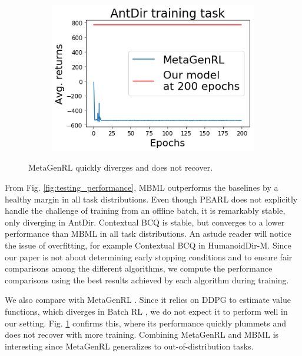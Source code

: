 \begin{figure}
    \vspace{-0.6em}
    \flushright
    \begin{subfigure}{0.259\paperwidth}
        \includegraphics[width=\linewidth]{chapter_2/fig/metagenrl.png}
    \end{subfigure}
    \caption{MetaGenRL quickly diverges and does not recover.} %
    \label{fig:metagenrl}
    \vspace{0.05em}
\end{figure}

From Fig. \ref{fig:testing_performance}, MBML outperforms the baselines by a healthy margin in all task distributions. Even though PEARL does not explicitly handle the challenge of training from an offline batch, it is remarkably stable, only diverging in AntDir. Contextual BCQ is stable, but converges to a lower performance than MBML in all task distributions. An astude reader will notice the issue of overfitting, for example Contextual BCQ in HumanoidDir-M. Since our paper is not about determining early stopping conditions and to ensure fair comparisons among the different algorithms, we compute the performance comparisons using the best results achieved by each algorithm during training.

We also compare with MetaGenRL \cite{metagenrl}. Since it relies on DDPG \cite{ddpg} to estimate value functions, which diverges in Batch RL \cite{fujimoto2019off}, we do not expect it to perform well in our setting. Fig. \ref{fig:metagenrl} confirms this, where its performance quickly plummets and does not recover with more training.
Combining MetaGenRL and MBML is interesting since MetaGenRL generalizes to out-of-distribution tasks.


